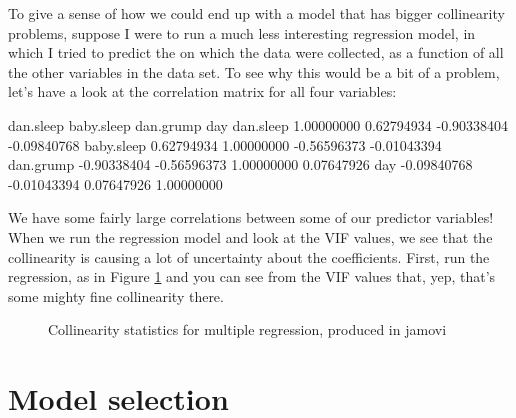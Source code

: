To give a sense of how we could end up with a model that has bigger collinearity problems, suppose I were to run a much less interesting regression model, in which I tried to predict the  on which the data were collected, as a function of all the other variables in the data set. To see why this would be a bit of a problem, let's have a look at the correlation matrix for all four variables:

\begin{rblock1}
             dan.sleep  baby.sleep   dan.grump         day
dan.sleep   1.00000000  0.62794934 -0.90338404 -0.09840768
baby.sleep  0.62794934  1.00000000 -0.56596373 -0.01043394
dan.grump  -0.90338404 -0.56596373  1.00000000  0.07647926
day        -0.09840768 -0.01043394  0.07647926  1.00000000
\end{rblock1}

We have some fairly large correlations between some of our predictor variables! When we run the regression model and look at the VIF values, we see that the collinearity is causing a lot of uncertainty about the coefficients. First, run the regression, as in Figure \ref{fig:reg7}  and you can see from the VIF values that, yep, that's some mighty fine collinearity there.

\begin{figure}[!htb]
\begin{center}
\caption{Collinearity statistics for multiple regression, produced in jamovi }
\HR
\label{fig:reg7}
\end{center}
\end{figure}


\section{Model selection\label{sec:modelselreg}}

